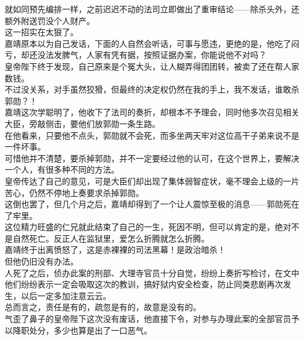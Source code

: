 \begin{multicols}{\theparacolNo}
就如同预先编排一样，之前迟迟不动的法司立即做出了重审结论——除杀头外，还额外附送罚没个人财产。\\

这一招实在太狠了。\\

嘉靖原本以为自己发话，下面的人自然会听话，可事与愿违，更绝的是，他吃了闷亏，却还没法发脾气，人家有凭有据，按照证据办案，你能说他不对吗？\\

皇帝陛下终于发现，自己原来是个冤大头，让人糊弄得团团转，被卖了还在帮人家数钱。\\

不过没关系，对手虽然狡猾，但最终的决定权仍然在我的手上，我不发话，谁敢杀郭勋？！\\

嘉靖这次学聪明了，他收下了法司的奏折，却根本不予理会，同时他多次召见相关大臣，旁敲侧击，要他们放郭勋一条生路。\\

在他看来，只要他不点头，郭勋就不会死，而多坐两天牢对这位高干子弟来说不是一件坏事。\\

可惜他并不清楚，要杀掉郭勋，并不一定要经过他的认可，在这个世界上，要解决一个人，有很多种不同的方法。\\

皇帝传达了自己的意见，可是大臣们却出现了集体弱智症状，毫不理会上级的一片苦心，仍然不停地上奏要求杀掉郭勋。\\

这倒也罢了，但几个月之后，嘉靖却得到了一个让人震惊至极的消息——郭勋死在了牢里。\\

这位精力旺盛的仁兄就此结束了自己的一生，死因不明，但可以肯定的是，绝对不是自然死亡。反正人在监狱里，爱怎么折腾就怎么折腾。\\

嘉靖终于出离愤怒了，这是赤裸裸的司法黑幕！是政治暗杀！\\

但他仍旧没有办法。\\

人死了之后，侦办此案的刑部、大理寺官员十分自觉，纷纷上奏折写检讨，在文中他们纷纷表示一定会吸取这次的教训，搞好狱内安全检查，防止同类悲剧再次发生，以后一定多加注意云云。\\

总而言之，责任是有的，疏忽是有的，故意是没有的。\\

气歪了鼻子的皇帝陛下这次没有废话，他直接下令，对参与办理此案的全部官员予以降职处分，多少也算是出了一口恶气。\\


\end{multicols}
